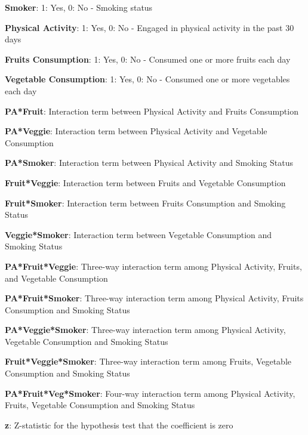 \documentclass[11pt]{article}
\begin{document}
\begin{codeoutput}
\begin{table}[h]
\begin{threeparttable}
\begin{tablenotes}
\item \textbf{Smoker}: 1: Yes, 0: No - Smoking status
\item \textbf{Physical Activity}: 1: Yes, 0: No - Engaged in physical activity in the past 30 days
\item \textbf{Fruits Consumption}: 1: Yes, 0: No - Consumed one or more fruits each day
\item \textbf{Vegetable Consumption}: 1: Yes, 0: No - Consumed one or more vegetables each day
\item \textbf{PA*Fruit}: Interaction term between Physical Activity and Fruits Consumption
\item \textbf{PA*Veggie}: Interaction term between Physical Activity and Vegetable Consumption
\item \textbf{PA*Smoker}: Interaction term between Physical Activity and Smoking Status
\item \textbf{Fruit*Veggie}: Interaction term between Fruits and Vegetable Consumption
\item \textbf{Fruit*Smoker}: Interaction term between Fruits Consumption and Smoking Status
\item \textbf{Veggie*Smoker}: Interaction term between Vegetable Consumption and Smoking Status
\item \textbf{PA*Fruit*Veggie}: Three-way interaction term among Physical Activity, Fruits, and Vegetable Consumption
\item \textbf{PA*Fruit*Smoker}: Three-way interaction term among Physical Activity, Fruits Consumption and Smoking Status
\item \textbf{PA*Veggie*Smoker}: Three-way interaction term among Physical Activity, Vegetable Consumption and Smoking Status
\item \textbf{Fruit*Veggie*Smoker}: Three-way interaction term among Fruits, Vegetable Consumption and Smoking Status
\item \textbf{PA*Fruit*Veg*Smoker}: Four-way interaction term among Physical Activity, Fruits, Vegetable Consumption and Smoking Status
\item \textbf{z}: Z-statistic for the hypothesis test that the coefficient is zero
\end{tablenotes}
\end{threeparttable}
\end{table}

\end{codeoutput}
\end{document}
